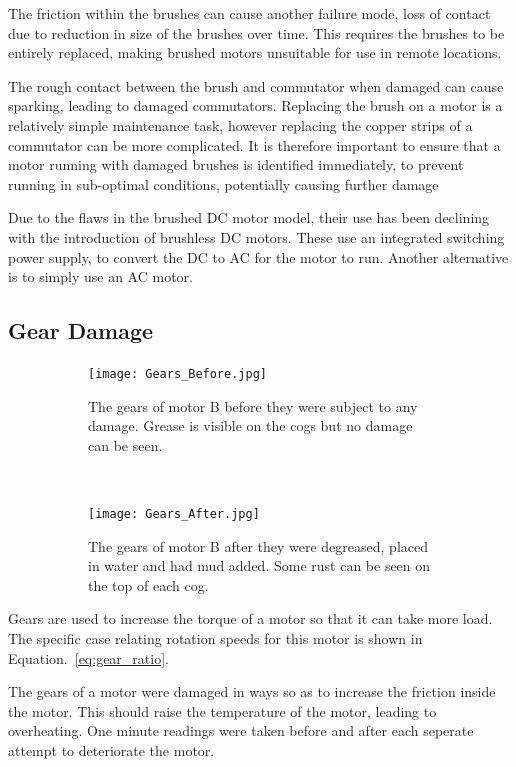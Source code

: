 The friction within the brushes can cause another failure mode, loss of contact due to reduction in size of the brushes over time. This requires the brushes to be entirely replaced, making brushed motors unsuitable for use in remote locations.

The rough contact between the brush and commutator when damaged can cause sparking, leading to damaged commutators. Replacing the brush on a motor is a relatively simple maintenance task, however replacing the copper strips of a commutator can be more complicated. It is therefore important to ensure that a motor running with damaged brushes is identified immediately, to prevent running in sub-optimal conditions, potentially causing further damage

Due to the flaws in the brushed DC motor model, their use has been declining with the introduction of brushless DC motors. These use an integrated switching power supply, to convert the DC to AC for the motor to run. Another alternative is to simply use an AC motor. 

\subsection{Gear Damage}

\begin{figure}[t!]
    \centering
    \begin{subfigure}[t]{0.5\textwidth}
        \centering
        \texttt{[image: Gears\_Before.jpg]}
        \caption[Healthy Gears]{The gears of motor B before they were subject to any damage. Grease is visible on the cogs but no damage can be seen.}
    \end{subfigure}%
    ~ 
    \begin{subfigure}[t]{0.5\textwidth}
        \centering
         \texttt{[image: Gears\_After.jpg]}
    \caption[Damaged Gears]{The gears of motor B after they were degreased, placed in water and had mud added. Some rust can be seen on the top of each cog.}
    \end{subfigure}
    \caption[Motor Gears]{}
\end{figure}

Gears are used to increase the torque of a motor so that it can take more load. The specific case relating rotation speeds for this motor is shown in Equation.~\eqref{eq:gear_ratio}.

The gears of a motor were damaged in ways so as to increase the friction inside the motor. This should raise the temperature of the motor, leading to overheating. One minute readings were taken before and after each seperate attempt to deteriorate the motor. 

